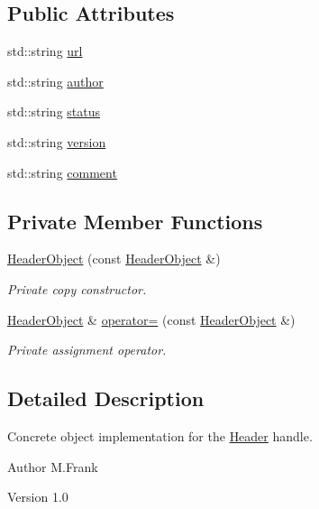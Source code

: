 \subsection*{Public Attributes}
\begin{DoxyCompactItemize}
\item 
std::string \hyperlink{class_d_d4hep_1_1_geometry_1_1_header_object_a702018d66501a7a062895ca2f481e697}{url}
\item 
std::string \hyperlink{class_d_d4hep_1_1_geometry_1_1_header_object_a63216a220333f0c791f5dc9676e9c38d}{author}
\item 
std::string \hyperlink{class_d_d4hep_1_1_geometry_1_1_header_object_a20972a1281cbc8afec103918e9cdae43}{status}
\item 
std::string \hyperlink{class_d_d4hep_1_1_geometry_1_1_header_object_a9a2b7104b14240b8b884ff0519307204}{version}
\item 
std::string \hyperlink{class_d_d4hep_1_1_geometry_1_1_header_object_aead0ebf0a1dcc61fbb5f30ca5113484f}{comment}
\end{DoxyCompactItemize}
\subsection*{Private Member Functions}
\begin{DoxyCompactItemize}
\item 
\hyperlink{class_d_d4hep_1_1_geometry_1_1_header_object_a335972108c4e573ae75d9f174b8acc19}{HeaderObject} (const \hyperlink{class_d_d4hep_1_1_geometry_1_1_header_object}{HeaderObject} \&)
\begin{DoxyCompactList}\small\item\em Private copy constructor. \item\end{DoxyCompactList}\item 
\hyperlink{class_d_d4hep_1_1_geometry_1_1_header_object}{HeaderObject} \& \hyperlink{class_d_d4hep_1_1_geometry_1_1_header_object_aa577cb624bf183b4ac62e22554f069f1}{operator=} (const \hyperlink{class_d_d4hep_1_1_geometry_1_1_header_object}{HeaderObject} \&)
\begin{DoxyCompactList}\small\item\em Private assignment operator. \item\end{DoxyCompactList}\end{DoxyCompactItemize}


\subsection{Detailed Description}
Concrete object implementation for the \hyperlink{class_d_d4hep_1_1_geometry_1_1_header}{Header} handle. \begin{DoxyAuthor}{Author}
M.Frank 
\end{DoxyAuthor}
\begin{DoxyVersion}{Version}
1.0 
\end{DoxyVersion}


